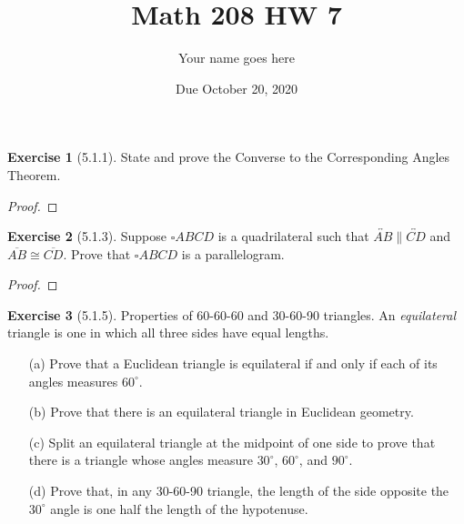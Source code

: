 \documentclass[11pt]{article}		%
\title{Math 208 HW 7}
\author{Your name goes here}
\date{Due October 20, 2020}
\newcommand{\lin}[1]{\overleftrightarrow{#1}}
\newcommand{\seg}[1]{\overline{#1}}
\theoremstyle{definition}
\newtheorem*{ex}{Exercise}
\begin{document}
	\maketitle
	
	
	


	
	\begin{ex}[5.1.1]
		State and prove the Converse to the Corresponding Angles Theorem.
		
	\end{ex}
	
	\begin{proof} 
		
	\end{proof}
	
	
\vspace{1in} %
	
	
	
	
	\begin{ex}[5.1.3]
		Suppose $\square ABCD$ is a quadrilateral such that $\lin{AB} \parallel \lin{CD}$ and $\seg{AB} \cong \seg{CD}$.  Prove that $\square ABCD$ is a parallelogram.
		
	\end{ex}
	
	\begin{proof} 
		
	\end{proof}
	
	
	
\vspace{1in} %
	


	
\begin{ex}[5.1.5]
	Properties of 60-60-60 and 30-60-90 triangles. An \textit{equilateral} triangle is one in which all three sides have equal lengths.
	
	\begin{enumerate}
		\item[(a)] Prove that a Euclidean triangle is equilateral if and only if each of its angles measures $60^\circ$.
		\item[(b)] Prove that there is an equilateral triangle in Euclidean geometry.
		\item[(c)] Split an equilateral triangle at the midpoint of one side to prove that there is a triangle whose angles measure $30^\circ$, $60^\circ$, and $90^\circ$.
		\item[(d)] Prove that, in any 30-60-90 triangle, the length of the side opposite the $30^\circ$ angle is one half the length of the hypotenuse.
	\end{enumerate}
	
\end{ex}
\end{document}
